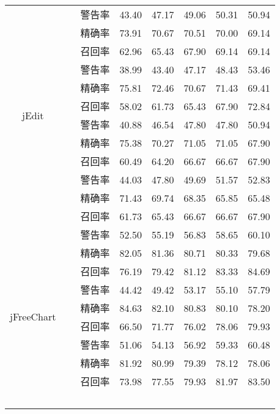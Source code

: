 \begin{table}
\begin{tabular}{cccccccc}
 \hline
\multirow{12}{*}{jEdit     }
&~\multirow{3}{*}{全部(\%)}
&     警告率       & 43.40 & 47.17 & 49.06 & 50.31 & 50.94 \\
 &   & 精确率       & 73.91 & 70.67 & 70.51 & 70.00 & 69.14 \\
&             & 召回率       & 62.96 & 65.43 & 67.90 & 69.14 & 69.14 \\
\cline{2-8}
&~\multirow{3}{*}{无Code组 (\%)}
&   警告率       & 38.99 & 43.40 & 47.17 & 48.43 & 53.46 \\
&  & 精确率       & 75.81 & 72.46 & 70.67 & 71.43 & 69.41 \\
&             & 召回率       & 58.02 & 61.73 & 65.43 & 67.90 & 72.84 \\
\cline{2-8}
&~\multirow{3}{*}{无Context组   (\%)}
&    警告率       & 40.88 & 46.54 & 47.80 & 47.80 & 50.94 \\
&  & 精确率       & 75.38 & 70.27 & 71.05 & 71.05 & 67.90 \\
&   & 召回率       & 60.49 & 64.20 & 66.67 & 66.67 & 67.90 \\
\cline{2-8}
&~\multirow{3}{*}{无Evolution组(\%)}
&   警告率       & 44.03 & 47.80 & 49.69 & 51.57 & 52.83 \\
 &  & 精确率       & 71.43 & 69.74 & 68.35 & 65.85 & 65.48 \\
&             & 召回率       & 61.73 & 65.43 & 66.67 & 66.67 & 67.90 \\
 \hline
\multirow{12}{*}{jFreeChart  }
&~\multirow{3}{*}{全部(\%)}
&    警告率       & 52.50 & 55.19 & 56.83 & 58.65 & 60.10 \\
 &   & 精确率       & 82.05 & 81.36 & 80.71 & 80.33 & 79.68 \\
&             & 召回率       & 76.19 & 79.42 & 81.12 & 83.33 & 84.69 \\
 \cline{2-8}
&~\multirow{3}{*}{无Code组(\%)}
&   警告率       & 44.42 & 49.42 & 53.17 & 55.10 & 57.79 \\
 &       & 精确率       & 84.63 & 82.10 & 80.83 & 80.10 & 78.20 \\
&             & 召回率       & 66.50 & 71.77 & 76.02 & 78.06 & 79.93 \\
 \cline{2-8}
 &~\multirow{3}{*}{无Context组(\%)}         
 &   警告率       & 51.06 & 54.13 & 56.92 & 59.33 & 60.48 \\
&    & 精确率       & 81.92 & 80.99 & 79.39 & 78.12 & 78.06 \\
 &             & 召回率       & 73.98 & 77.55 & 79.93 & 81.97 & 83.50 \\
 \cline{2-8}
&~\multirow{3}{*}{无Evolution组(\%)}    

\end{tabular}
\end{table}
